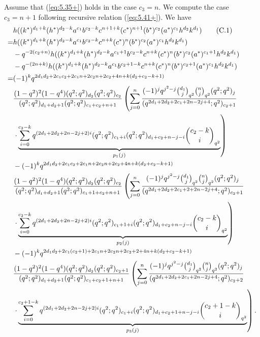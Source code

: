 \documentclass[table,a4paper,reqno]{amsart}
\numberwithin{equation}{section}
\theoremstyle{definition}
\begin{document}
Assume that (\ref{eq:5.35+}) holds in the case $c_3=n$. We compute the case $c_3=n+1$ following recursive relation (\ref{eq:5.41+}). We have
\begin{align}\label{eq:b.1}\stepcounter{equation}
        &h((k^*)^{d_1+k}(h^*)^{d_2-k}a^{c_1}b^{c_2-k}c^{n+1+k}(c^*)^{n+1}(b^*)^{c_2}(a^*)^{c_1}h^{d_2}k^{d_1})\tag{C.1}\\
        =&h((k^*)^{d_1+k}(h^*)^{d_2-k}a^{c_1}b^{c_2-k}c^{n+k}(c^*)^{n}(b^*)^{c_2}(a^*)^{c_1}h^{d_2}k^{d_1})\notag\\
        &-q^{-2(c_2+n)}h((k^*)^{d_1+k}(h^*)^{d_2-k}a^{c_1+1}b^{c_2-k}c^{n+k}(c^*)^{n}(b^*)^{c_2}(a^*)^{c_1+1}h^{d_2}k^{d_1})\notag\\
        &-q^{-(2n+k)}h((k^*)^{d_1+k}(h^*)^{d_2-k}a^{c_1}b^{c_2+1-k}c^{n+k}(c^*)^{n}(b^*)^{c_2+1}(a^*)^{c_1}h^{d_2}k^{d_1})\notag\\
        =&(-1)^kq^{2d_1d_2+2c_1c_2+2c_1n+2c_2n+2c_2+4n+k(d_2+c_2-k+1)}\notag\\
        &\frac{(1-q^2)^2(1-q^4)(q^2;q^2)_{d_2}(q^2;q^2)_{c_2}}{(q^2;q^2)_{d_1+d_2+1}(q^2;q^2)_{c_1+c_2+n+1}}\left(\sum_{j=0}^{n}\frac{(-1)^{j}q^{j^2-j}{d_1\choose j}_{q^{2}}{n\choose j}_{q^2}(q^2;q^2)_{j}}{(q^{2d_1+2d_2+2c_1+2n-2j+4};q^2)_{c_2+1}}\right.\notag\\
        &\left.\cdot\underbrace{\sum_{i=0}^{c_2-k}q^{(2d_1+2d_2+2n-2j+2)i}(q^2;q^2)_{c_1+i}(q^2;q^2)_{d_1+c_2+n-j-i}{c_2-k\choose i}_{q^2}}_{p_1(j)}\right)\notag\\
        &-(-1)^kq^{2d_1d_2+2c_1c_2+2c_1n+2c_2n+2c_2+4n+k(d_2+c_2-k+1)}\notag\\
        &\frac{(1-q^2)^2(1-q^4)(q^2;q^2)_{d_2}(q^2;q^2)_{c_2}}{(q^2;q^2)_{d_1+d_2+1}(q^2;q^2)_{c_1+1+c_2+n+1}}\left(\sum_{j=0}^{n}\frac{(-1)^{j}q^{j^2-j}{d_1\choose j}_{q^{2}}{n\choose j}_{q^2}(q^2;q^2)_{j}}{(q^{2d_1+2d_2+2c_1+2+2n-2j+4};q^2)_{c_2+1}}\right.\notag\\
        &\left.\cdot\underbrace{\sum_{i=0}^{c_2-k}q^{(2d_1+2d_2+2n-2j+2)i}(q^2;q^2)_{c_1+1+i}(q^2;q^2)_{d_1+c_2+n-j-i}{c_2-k\choose i}_{q^2}}_{p_2(j)}\right)\notag\\
        &-(-1)^kq^{2d_1d_2+2c_1(c_2+1)+2c_1n+2c_2n+2c_2+2+4n+k(d_2+c_2-k+1)}\notag\\
        &\frac{(1-q^2)^2(1-q^4)(q^2;q^2)_{d_2}(q^2;q^2)_{c_2+1}}{(q^2;q^2)_{d_1+d_2+1}(q^2;q^2)_{c_1+c_2+1+n+1}}\left(\sum_{j=0}^{n}\frac{(-1)^{j}q^{j^2-j}{d_1\choose j}_{q^{2}}{n\choose j}_{q^2}(q^2;q^2)_{j}}{(q^{2d_1+2d_2+2c_1+2n-2j+4};q^2)_{c_2+2}}\right.\notag\\
        &\left.\cdot\underbrace{\sum_{i=0}^{c_2+1-k}q^{(2d_1+2d_2+2n-2j+2)i}(q^2;q^2)_{c_1+i}(q^2;q^2)_{d_1+c_2+1+n-j-i}{c_2+1-k\choose i}_{q^2}}_{p_3(j)}\right).\notag
\end{align}
\end{document}
